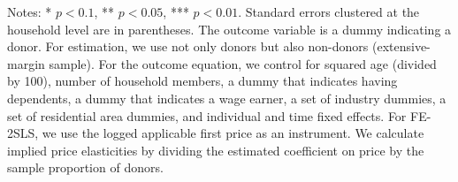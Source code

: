 \begin{table}
\begin{threeparttable}
\begin{tablenotes}
\item Notes: * $p < 0.1$, ** $p < 0.05$, *** $p < 0.01$. Standard errors clustered at the household level are in parentheses. The outcome variable is a dummy indicating a donor. For estimation, we use not only donors but also non-donors (extensive-margin sample). For the outcome equation, we control for squared age (divided by 100), number of household members, a dummy that indicates having dependents, a dummy that indicates a wage earner, a set of industry dummies, a set of residential area dummies, and individual and time fixed effects. For FE-2SLS, we use the logged applicable first price as an instrument. We calculate implied price elasticities by dividing the estimated coefficient on price by the sample proportion of donors.
\end{tablenotes}
\end{threeparttable}
\end{table}
